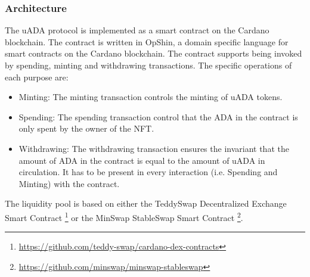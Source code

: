 \documentclass[11pt]{article}
\begin{document}
\subsubsection{Architecture}
\label{sec:architecture}

The uADA protocol is implemented as a smart contract on the Cardano blockchain.
The contract is written in OpShin, a domain specific language for smart contracts on the Cardano blockchain.
The contract supports being invoked by spending, minting and withdrawing transactions.
The specific operations of each purpose are:

\begin{itemize}
    \item Minting: The minting transaction controls the minting of uADA tokens.
    \item Spending: The spending transaction control that the ADA in the contract is only spent by the owner of the NFT.
    \item Withdrawing: The withdrawing transaction ensures the invariant that the amount of ADA in the contract is equal to the amount of uADA in circulation. It has to be present in every interaction (i.e. Spending and Minting) with the contract.
\end{itemize}

The liquidity pool is based on either the TeddySwap Decentralized Exchange Smart Contract \footnote{\url{https://github.com/teddy-swap/cardano-dex-contracts}} or the MinSwap StableSwap Smart Contract \footnote{\url{https://github.com/minswap/minswap-stableswap}}.
\end{document}
